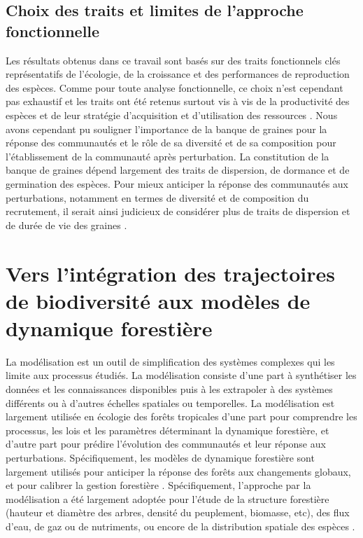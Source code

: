 \documentclass[
  11pt,
  french,
  A4paper,
  extrafontsizes,onecolumn,openright
  ]{memoir}
\begin{document}
\subsection{Choix des traits et limites de l'approche
fonctionnelle}\label{choix-des-traits-et-limites-de-lapproche-fonctionnelle}

Les résultats obtenus dans ce travail sont basés sur des traits
fonctionnels clés représentatifs de l'écologie, de la croissance et des
performances de reproduction des espèces. Comme pour toute analyse
fonctionnelle, ce choix n'est cependant pas exhaustif et les traits ont
été retenus surtout vis à vis de la productivité des espèces et de leur
stratégie d'acquisition et d'utilisation des ressources
\autocites{Reich2014}{Kunstler2016}. Nous avons cependant pu souligner
l'importance de la banque de graines pour la réponse des communautés et
le rôle de sa diversité et de sa composition pour l'établissement de la
communauté après perturbation. La constitution de la banque de graines
dépend largement des traits de dispersion, de dormance et de germination
des espèces. Pour mieux anticiper la réponse des communautés aux
perturbations, notamment en termes de diversité et de composition du
recrutement, il serait ainsi judicieux de considérer plus de traits de
dispersion et de durée de vie des graines
\autocites{Verdu2005}{Schleuning2016}.

\section{Vers l'intégration des trajectoires de biodiversité aux modèles
de dynamique
forestière}\label{vers-lintegration-des-trajectoires-de-biodiversite-aux-modeles-de-dynamique-forestiere}

La modélisation est un outil de simplification des systèmes complexes
qui les limite aux processus étudiés. La modélisation consiste d'une
part à synthétiser les données et les connaissances disponibles puis à
les extrapoler à des systèmes différents ou à d'autres échelles
spatiales ou temporelles. La modélisation est largement utilisée en
écologie des forêts tropicales d'une part pour comprendre les processus,
les lois et les paramètres déterminant la dynamique forestière, et
d'autre part pour prédire l'évolution des communautés et leur réponse
aux perturbations. Spécifiquement, les modèles de dynamique forestière
sont largement utilisés pour anticiper la réponse des forêts aux
changements globaux, et pour calibrer la gestion forestière
\autocite{Gourlet-Fleury2005}. Spécifiquement, l'approche par la
modélisation a été largement adoptée pour l'étude de la structure
forestière (hauteur et diamètre des arbres, densité du peuplement,
biomasse, etc), des flux d'eau, de gaz ou de nutriments, ou encore de la
distribution spatiale des espèces
\autocites{Piponiot2016}{Rutishauser2016}{Grimm2017}.
\end{document}
